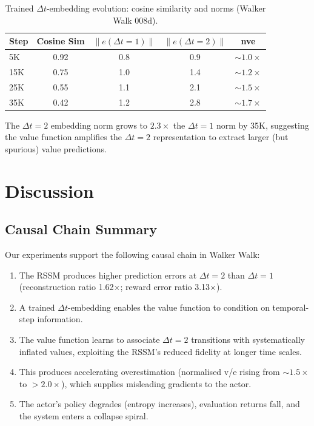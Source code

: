 \documentclass[letterpaper]{article}
\begin{document}
\begin{table}[h]
\centering
\caption{Trained $\Delta t$-embedding evolution: cosine similarity and norms (Walker Walk 008d).}
\label{tab:cosine}
\begin{tabular}{lcccc}
\toprule
Step & Cosine Sim & $\|e(\Delta t{=}1)\|$ & $\|e(\Delta t{=}2)\|$ & nve \\
\midrule
5K  & 0.92 & 0.8 & 0.9  & ${\sim}1.0\times$ \\
15K & 0.75 & 1.0 & 1.4  & ${\sim}1.2\times$ \\
25K & 0.55 & 1.1 & 2.1  & ${\sim}1.5\times$ \\
35K & 0.42 & 1.2 & 2.8  & ${\sim}1.7\times$ \\
\bottomrule
\end{tabular}
\end{table}

The $\Delta t{=}2$ embedding norm grows to $2.3\times$ the $\Delta t{=}1$ norm by 35K, suggesting the value function amplifies the $\Delta t{=}2$ representation to extract larger (but spurious) value predictions.

\section{Discussion}

\subsection{Causal Chain Summary}

Our experiments support the following causal chain in Walker Walk:

\begin{enumerate}[nosep]
    \item The RSSM produces higher prediction errors at $\Delta t{=}2$ than $\Delta t{=}1$ (reconstruction ratio 1.62$\times$; reward error ratio 3.13$\times$).
    \item A trained $\Delta t$-embedding enables the value function to condition on temporal-step information.
    \item The value function learns to associate $\Delta t{=}2$ transitions with systematically inflated values, exploiting the RSSM's reduced fidelity at longer time scales.
    \item This produces accelerating overestimation (normalised v/e rising from ${\sim}1.5\times$ to $>2.0\times$), which supplies misleading gradients to the actor.
    \item The actor's policy degrades (entropy increases), evaluation returns fall, and the system enters a collapse spiral.
\end{enumerate}
\end{document}
